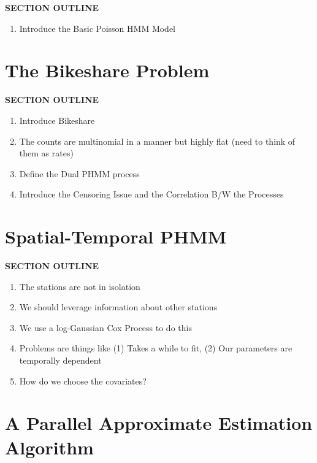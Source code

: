\documentclass{acm_proc_article-sp}
\begin{document}
\vspace{0.25cm}
{\bf SECTION OUTLINE}
\begin{enumerate}
\item Introduce the Basic Poisson HMM Model
\end{enumerate}
\vspace{0.5cm}


\section{The Bikeshare Problem}

\vspace{0.25cm}
{\bf SECTION OUTLINE}
\begin{enumerate}
\item Introduce Bikeshare
\item The counts are multinomial in a manner but highly flat (need to think of them as rates)
\item Define the Dual PHMM process
\item Introduce the Censoring Issue and the Correlation B/W the Processes
\end{enumerate}
\vspace{0.5cm}

\section{Spatial-Temporal PHMM}

\vspace{0.25cm}
{\bf SECTION OUTLINE}
\begin{enumerate}
\item The stations are not in isolation
\item We should leverage information about other stations
\item We use a log-Gaussian Cox Process to do this
\item Problems are things like (1) Takes a while to fit, (2) Our parameters are temporally dependent 
\item How do we choose the covariates?
\end{enumerate}
\vspace{0.5cm}

\section{A Parallel Approximate Estimation Algorithm}
\end{document}
